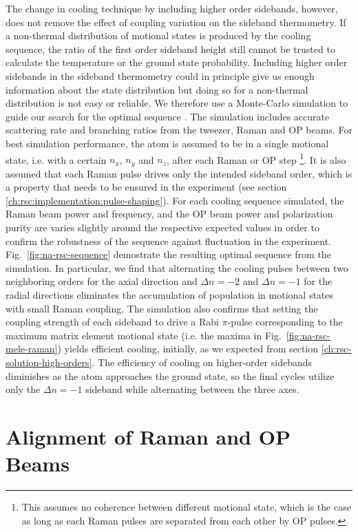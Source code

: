 The change in cooling technique by including higher order sidebands, however,
does not remove the effect of coupling variation on the sideband thermometry.
If a non-thermal distribution of motional states is produced by the cooling sequence,
the ratio of the first order sideband height still cannot be trusted to calculate
the temperature or the ground state probability.
Including higher order sidebands in the sideband thermometry could in principle
give us enough information about the state distribution but doing
so for a non-thermal distribution is not easy or reliable.
We therefore use a Monte-Carlo simulation to guide our search
for the optimal sequence \todo{\cite{}}.
The simulation includes accurate scattering rate and branching ratios
from the tweezer, Raman and OP beams.
For best simulation performance, the atom is assumed to be in a single motional state,
i.e. with a certain $n_x$, $n_y$ and $n_z$, after each Raman or OP step
\footnote{This assumes no coherence between different motional state,
  which is the case as long as each Raman pulses are separated from each other by OP pulses.}.
It is also assumed that each Raman pulse drives only the intended sideband order,
which is a property that needs to be ensured in the experiment (see section \ref{ch:rsc:implementation:pulse-shaping}).
For each cooling sequence simulated,
the Raman beam power and frequency, and the OP beam power and polarization purity
are varies slightly around the respective expected values
in order to confirm the robustness of the sequence against fluctuation in the experiment.
Fig.~\ref{fig:na-rsc-sequence} demostrate the resulting optimal sequence from the simulation.
In particular, we find that alternating the cooling pulses between two
neighboring orders for the axial direction and $\Delta n=-2$ and $\Delta n=-1$
for the radial directions
eliminates the accumulation of population in motional states with small Raman coupling.
The simulation also confirms that setting the coupling strength of each sideband
to drive a Rabi $\pi$-pulse corresponding to the maximum matrix element motional state
(i.e. the maxima in Fig.~\ref{fig:na-rsc-mele-raman}) yields efficient cooling, initially,
as we expected from section \ref{ch:rsc-solution-high-orders}.
The efficiency of cooling on higher-order sidebands diminishes
as the atom approaches the ground state, so the final cycles utilize only
the $\Delta n=-1$ sideband while alternating between the three axes.

\section{Alignment of Raman and OP Beams}

